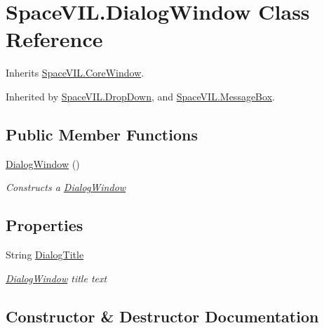 \hypertarget{class_space_v_i_l_1_1_dialog_window}{}\section{Space\+V\+I\+L.\+Dialog\+Window Class Reference}
\label{class_space_v_i_l_1_1_dialog_window}


Inherits \mbox{\hyperlink{class_space_v_i_l_1_1_core_window}{Space\+V\+I\+L.\+Core\+Window}}.



Inherited by \mbox{\hyperlink{class_space_v_i_l_1_1_drop_down}{Space\+V\+I\+L.\+Drop\+Down}}, and \mbox{\hyperlink{class_space_v_i_l_1_1_message_box}{Space\+V\+I\+L.\+Message\+Box}}.

\subsection*{Public Member Functions}
\begin{DoxyCompactItemize}
\item 
\mbox{\hyperlink{class_space_v_i_l_1_1_dialog_window_afe7940f2348ea9f8d760c2b7ce4877c2}{Dialog\+Window}} ()
\begin{DoxyCompactList}\small\item\em Constructs a \mbox{\hyperlink{class_space_v_i_l_1_1_dialog_window}{Dialog\+Window}} \end{DoxyCompactList}\end{DoxyCompactItemize}
\subsection*{Properties}
\begin{DoxyCompactItemize}
\item 
String \mbox{\hyperlink{class_space_v_i_l_1_1_dialog_window_a91fb9fd6d98afaad9d89a88891bb3250}{Dialog\+Title}}
\begin{DoxyCompactList}\small\item\em \mbox{\hyperlink{class_space_v_i_l_1_1_dialog_window}{Dialog\+Window}} title text \end{DoxyCompactList}\end{DoxyCompactItemize}


\subsection{Constructor \& Destructor Documentation}
\mbox{\label{class_space_v_i_l_1_1_dialog_window_afe7940f2348ea9f8d760c2b7ce4877c2}} 
